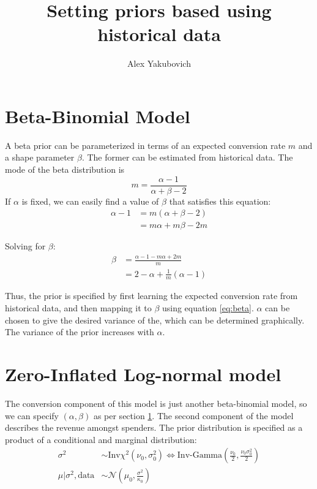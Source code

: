 \documentclass{article}
\title{Setting priors based using historical data}
\author{Alex Yakubovich}
\begin{document}
\maketitle
\section{Beta-Binomial Model}\label{sec:bb-model}
A beta prior can be parameterized in terms of an expected conversion rate $m$ and a shape parameter $\beta$. The former can be estimated from historical data.  The mode of the beta distribution is 
$$m = \frac{\alpha - 1}{\alpha + \beta -2}$$
If $\alpha$ is fixed, we can easily find a value of $\beta$ that satisfies this equation:
\begin{align}
\alpha - 1 &= m(\alpha + \beta - 2) \\
&= m\alpha + m\beta - 2m
\end{align}

Solving for $\beta$:
\begin{align}
\beta &= \frac{\alpha - 1 - m\alpha + 2m}{m} \\
&= 2 - \alpha + \frac{1}{m}\left(\alpha-1\right) \label{eq:beta}
\end{align}

Thus, the prior is specified by first learning the expected conversion rate from historical data, and then mapping it to $\beta$ using equation \ref{eq:beta}. $\alpha$ can be chosen to give the desired variance of the, which can be determined graphically. The variance of the prior increases with $\alpha$. 

\section{Zero-Inflated Log-normal model}

The conversion component of this model is just another beta-binomial model, so we can specify $(\alpha, \beta)$ as per section \ref{sec:bb-model}. The second component of the model describes the revenue amongst spenders. %
The prior distribution is specified as a product of a conditional and marginal distribution:
\begin{align}
\sigma^2 &\sim \text{Inv}\chi^2 (\nu_0, \sigma^2_0) \Leftrightarrow \text{Inv-Gamma}\left(\frac{\nu_0}{2}, \frac{\nu_0 \sigma^2_0}{2} \right) \label{eq:inv-gamma-prior}\\
\mu | \sigma^2, \text{data} &\sim \mathcal{N} \left(\mu_0, \frac{\sigma^2}{\kappa_0} \right)
\end{align}
\end{document}

